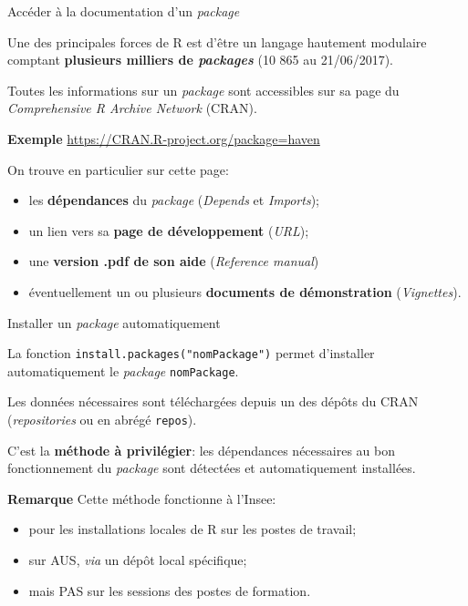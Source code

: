 \documentclass[12pt,ignorenonframetext,]{beamer}
\providecommand{\tightlist}{%
\setlength{\itemsep}{0pt}\setlength{\parskip}{0pt}}
\begin{document}
\begin{frame}{Accéder à la documentation d'un \emph{package}}

Une des principales forces de R est d'être un langage hautement
modulaire comptant \textbf{plusieurs milliers de \emph{packages}} (10
865 au 21/06/2017).

\pause Toutes les informations sur un \emph{package} sont accessibles
sur sa page du \emph{Comprehensive R Archive Network} (CRAN).

\textbf{Exemple} \url{https://CRAN.R-project.org/package=haven}

\pause \bigskip On trouve en particulier sur cette page:

\begin{itemize}
\tightlist
\item
  les \textbf{dépendances} du \emph{package} (\emph{Depends} et
  \emph{Imports});
\item
  un lien vers sa \textbf{page de développement} (\emph{URL});
\item
  une \textbf{version .pdf de son aide} (\emph{Reference manual})
\item
  éventuellement un ou plusieurs \textbf{documents de démonstration}
  (\emph{Vignettes}).
\end{itemize}

\end{frame}

\begin{frame}[fragile]{Installer un \emph{package} automatiquement}

La fonction \texttt{install.packages("nomPackage")} permet d'installer
automatiquement le \emph{package} \texttt{nomPackage}.

Les données nécessaires sont téléchargées depuis un des dépôts du CRAN
(\emph{repositories} ou en abrégé \texttt{repos}).

C'est la \textbf{méthode à privilégier}: les dépendances nécessaires au
bon fonctionnement du \emph{package} sont détectées et automatiquement
installées.

\pause 

\textbf{Remarque} Cette méthode fonctionne à l'Insee:

\begin{itemize}
\tightlist
\item
  pour les installations locales de R sur les postes de travail;
\item
  sur AUS, \emph{via} un dépôt local spécifique;
\item
  mais PAS sur les sessions des postes de formation.
\end{itemize}

\end{frame}
\end{document}

